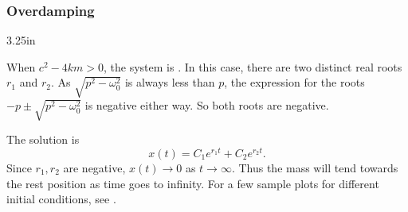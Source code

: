 \subsubsection{Overdamping}

\begin{mywrapfig}[15]{3.25in}
\capstart
{}
\caption{Overdamped motion for several different initial conditions.\label{mv:overdampedfig}}
\end{mywrapfig}
%
%

When
$c^2 - 4km > 0$, the system is \emph{}.  In this case,
there are two distinct real roots $r_1$ and $r_2$.
As $\sqrt{p^2 - \omega_0^2}$ is always less than $p$,
the expression for the roots
$-p \pm \sqrt{p^2 - \omega_0^2}$ is negative either way.
So both roots are negative.


The solution is
\begin{equation*}
x(t) = C_1 e^{r_1 t} + C_2 e^{r_2 t} .
\end{equation*}
Since $r_1, r_2$ are negative, $x(t) \to 0$ as $t \to \infty$.
Thus the mass will tend towards the rest position as
time goes to infinity.  For a few sample plots for different initial
conditions, see .


